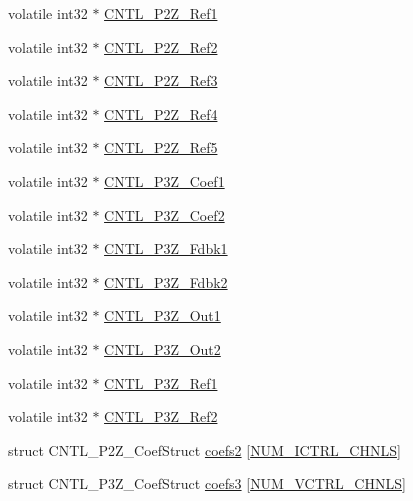 \begin{DoxyCompactItemize}
\item 
volatile int32 $\ast$ \hyperlink{a00009_a98527ce76f5175fa2933d46f324d85fb}{C\-N\-T\-L\-\_\-P2\-Z\-\_\-\-Ref1}
\item 
volatile int32 $\ast$ \hyperlink{a00009_a9bf1756a901a3a74d9f43a51f85cede4}{C\-N\-T\-L\-\_\-P2\-Z\-\_\-\-Ref2}
\item 
volatile int32 $\ast$ \hyperlink{a00009_a859e9bbd5bc82f1b42863a93e4f992af}{C\-N\-T\-L\-\_\-P2\-Z\-\_\-\-Ref3}
\item 
volatile int32 $\ast$ \hyperlink{a00009_af54c55f228deb8189c44282a94a870c1}{C\-N\-T\-L\-\_\-P2\-Z\-\_\-\-Ref4}
\item 
volatile int32 $\ast$ \hyperlink{a00009_abd3b240e2d3f7d3f4f717066ee8efd3e}{C\-N\-T\-L\-\_\-P2\-Z\-\_\-\-Ref5}
\item 
volatile int32 $\ast$ \hyperlink{a00009_a41005c53e7c439f0af28e140f7d3d0ed}{C\-N\-T\-L\-\_\-P3\-Z\-\_\-\-Coef1}
\item 
volatile int32 $\ast$ \hyperlink{a00009_a7a74642d86ae9a823f58f49db57f8bc8}{C\-N\-T\-L\-\_\-P3\-Z\-\_\-\-Coef2}
\item 
volatile int32 $\ast$ \hyperlink{a00009_a361372a23d9146cd2d077e6c843ec47e}{C\-N\-T\-L\-\_\-P3\-Z\-\_\-\-Fdbk1}
\item 
volatile int32 $\ast$ \hyperlink{a00009_a4676fa58f77cab7e1c4e86255049dfe7}{C\-N\-T\-L\-\_\-P3\-Z\-\_\-\-Fdbk2}
\item 
volatile int32 $\ast$ \hyperlink{a00009_acb0edbb1cfd2fb0e63ac2eb233dcd577}{C\-N\-T\-L\-\_\-P3\-Z\-\_\-\-Out1}
\item 
volatile int32 $\ast$ \hyperlink{a00009_a92dd8eabeed10eaaaf60887d9bcbd76d}{C\-N\-T\-L\-\_\-P3\-Z\-\_\-\-Out2}
\item 
volatile int32 $\ast$ \hyperlink{a00009_a6ebe91dab023eff56cade0eddcd3e96d}{C\-N\-T\-L\-\_\-P3\-Z\-\_\-\-Ref1}
\item 
volatile int32 $\ast$ \hyperlink{a00009_a589e93bad0b8ba223e32ce590bba816b}{C\-N\-T\-L\-\_\-P3\-Z\-\_\-\-Ref2}
\item 
struct C\-N\-T\-L\-\_\-P2\-Z\-\_\-\-Coef\-Struct \hyperlink{a00009_a0e862b208ff3b2bb45fcfce1ccd74cd2}{coefs2} \mbox{[}\hyperlink{a00029_a69b2e41c3deaae85991311202c4a1a14}{N\-U\-M\-\_\-\-I\-C\-T\-R\-L\-\_\-\-C\-H\-N\-L\-S}\mbox{]}
\item 
struct C\-N\-T\-L\-\_\-P3\-Z\-\_\-\-Coef\-Struct \hyperlink{a00009_a84b8a9f9bc8749e7ad42eea593f858c4}{coefs3} \mbox{[}\hyperlink{a00029_a42a316162edffd07a32e68a889760c06}{N\-U\-M\-\_\-\-V\-C\-T\-R\-L\-\_\-\-C\-H\-N\-L\-S}\mbox{]}
\end{DoxyCompactItemize}


